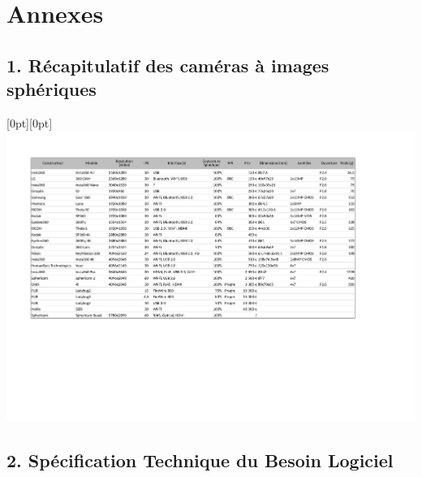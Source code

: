\appendix
\chapter*{Annexes}
\newpage
\thispagestyle{empty}
\section*{1. Récapitulatif des caméras à images sphériques}

	\raisebox{-200mm}[0pt][0pt]
	{
		\hspace*{-1cm}
		\includegraphics[angle=90,origin=c,scale=0.95]{premade/cameras_360.pdf}
	}
\newpage
\section*{2. Spécification Technique du Besoin Logiciel}
